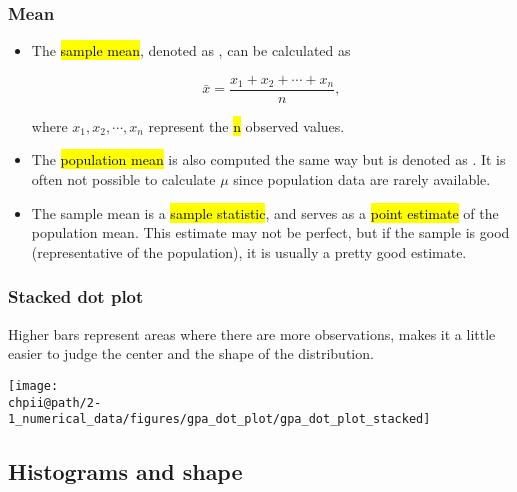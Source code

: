 \documentclass[slidestop,compress,mathserif]{beamer}
\makeatletter
\def\chpii@path{../../Chp 2}
\makeatother
\begin{document}
\begin{frame}
\frametitle{Mean}

\begin{itemize}

\item The \hl{sample mean}, denoted as , can be calculated as

\[ \bar{x} = \frac{x_1 + x_2 + \cdots + x_n}{n}, \]

where $x_1, x_2, \cdots, x_n$ represent the \hl{n} observed values.

\item The \hl{population mean} is also computed the same way but is denoted as \mathhl{\mu}. It is often not possible to calculate $\mu$ since population data are rarely available.

\item The sample mean is a \hl{sample statistic}, and serves as a \hl{point estimate} of the population mean. This estimate may not be perfect, but if the sample is good (representative of the population), it is usually a pretty good estimate. 

\end{itemize}

\end{frame}


\begin{frame}
\frametitle{Stacked dot plot}

Higher bars represent areas where there are more observations, makes it a little easier to judge the center and the shape of the distribution.

\begin{center}
\texttt{[image: \\chpii@path/2-1\_numerical\_data/figures/gpa\_dot\_plot/gpa\_dot\_plot\_stacked]}
\end{center}

\end{frame}


\subsection{Histograms and shape}

\end{document}
